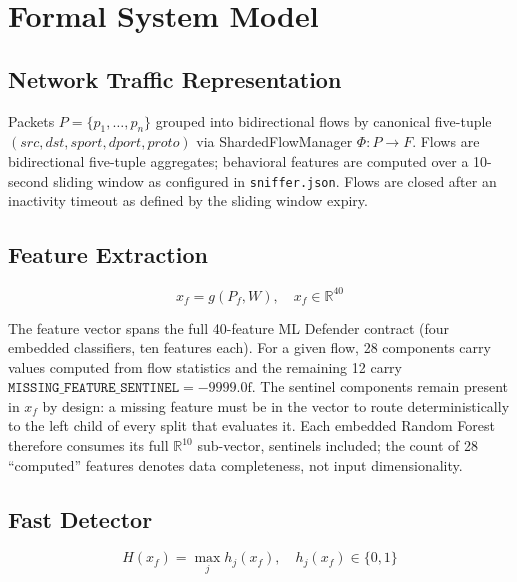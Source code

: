 \documentclass[11pt,a4paper]{article}
\begin{document}
    \section{Formal System Model}

    \subsection{Network Traffic Representation}

    Packets $P = \{p_1, \dots, p_n\}$ grouped into bidirectional flows by canonical five-tuple
    $(src, dst, sport, dport, proto)$ via ShardedFlowManager $\Phi : P \rightarrow F$. Flows
    are bidirectional five-tuple aggregates; behavioral features are computed over a 10-second
    sliding window as configured in \texttt{sniffer.json}. Flows are closed after an inactivity
    timeout as defined by the sliding window expiry.

    \subsection{Feature Extraction}

    \begin{equation}
        x_f = g(P_f, W), \quad x_f \in \mathbb{R}^{40}
    \end{equation}

    The feature vector spans the full 40-feature ML Defender contract (four embedded
    classifiers, ten features each). For a given flow, 28 components carry values computed
    from flow statistics and the remaining 12 carry
    $\texttt{MISSING\_FEATURE\_SENTINEL} = -9999.0\text{f}$. The sentinel components remain
    present in $x_f$ by design: a missing feature must be in the vector to route
    deterministically to the left child of every split that evaluates it. Each embedded
    Random Forest therefore consumes its full $\mathbb{R}^{10}$ sub-vector, sentinels
    included; the count of 28 ``computed'' features denotes data completeness, not input
    dimensionality.

    \subsection{Fast Detector}

    \begin{equation}
        H(x_f) = \max_j h_j(x_f), \quad h_j(x_f) \in \{0, 1\}
    \end{equation}
\end{document}
